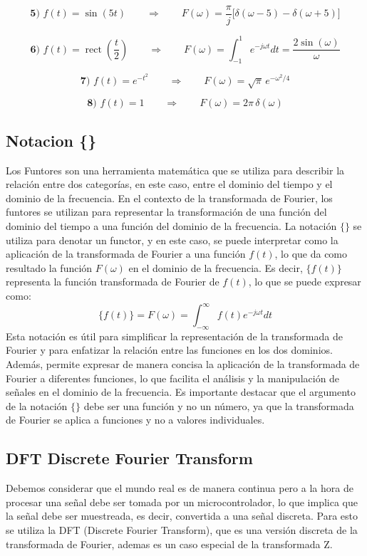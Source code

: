 \documentclass[12pt]{article}
\begin{document}
\[
\textbf{5) } f(t)=\sin(5t)
\qquad\Longrightarrow\qquad
F(\omega)=\frac{\pi}{j}\big[\delta(\omega-5)-\delta(\omega+5)\big]
\]

\[
\textbf{6) } f(t)=\operatorname{rect}\!\left(\frac{t}{2}\right)
\qquad\Longrightarrow\qquad
F(\omega)=\int_{-1}^{1}e^{-j\omega t}dt
=\frac{2\sin(\omega)}{\omega}
\]

\[
\textbf{7) } f(t)=e^{-t^2}
\qquad\Longrightarrow\qquad
F(\omega)=\sqrt{\pi}\,e^{-\omega^2/4}
\]

\[
\textbf{8) } f(t)=1
\qquad\Longrightarrow\qquad
F(\omega)=2\pi\,\delta(\omega)
\]

\subsection{Notacion \{\} }
Los Funtores son una herramienta matemática que se utiliza para describir la relación entre dos categorías, en este caso, entre el dominio del tiempo y el dominio de la frecuencia. En el contexto de la transformada de Fourier, los funtores se utilizan para representar la transformación de una función del dominio del tiempo a una función del dominio de la frecuencia. La notación $\{\}$ se utiliza para denotar un functor, y en este caso, se puede interpretar como la aplicación de la transformada de Fourier a una función $f(t)$, lo que da como resultado la función $F(\omega)$ en el dominio de la frecuencia. Es decir, $\{f(t)\}$ representa la función transformada de Fourier de $f(t)$, lo que se puede expresar como:
$$\{f(t)\} = F(\omega) = \int_{-\infty}^{\infty} f(t) e^{-j\omega t} dt$$
Esta notación es útil para simplificar la representación de la transformada de Fourier y para enfatizar la relación entre las funciones en los dos dominios. Además, permite expresar de manera concisa la aplicación de la transformada de Fourier a diferentes funciones, lo que facilita el análisis y la manipulación de señales en el dominio de la frecuencia. Es importante destacar que el argumento de la notación $\{\}$ debe ser una función y no un número, ya que la transformada de Fourier se aplica a funciones y no a valores individuales.
\newpage

\subsection{DFT Discrete Fourier Transform}
Debemos considerar que el mundo real es de manera continua pero a la hora de procesar una señal debe ser tomada por un microcontrolador, lo que implica que la señal debe ser muestreada, es decir, convertida a una señal discreta. 
Para esto se utiliza la DFT (Discrete Fourier Transform), que es una versión discreta de la transformada de Fourier, ademas es un caso especial de la transformada Z.  \cite{wolfram-dft}
\end{document}
